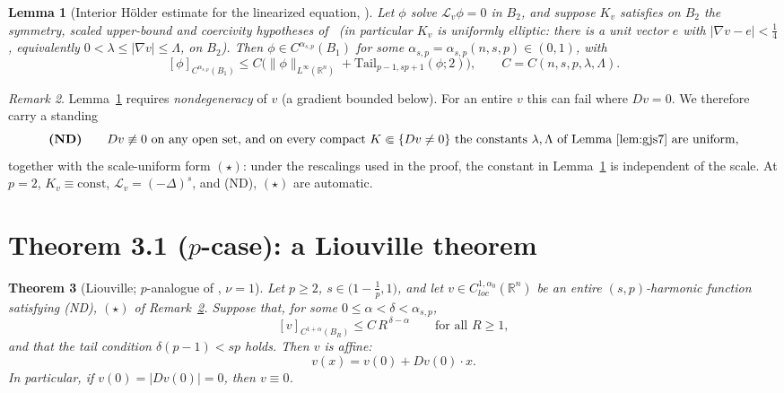 \documentclass[11pt]{amsart}
\theoremstyle{plain}
\newtheorem{theorem}{Theorem}[section]
\newtheorem{lemma}[theorem]{Lemma}
\theoremstyle{definition}
\theoremstyle{remark}
\newtheorem{remark}[theorem]{Remark}
\newcommand{\R}{\mathbb{R}}
\newcommand{\Lv}{\mathcal L_{v}}
\newcommand{\al}{\alpha}
\newcommand{\asp}{\alpha_{s,p}}
\begin{document}
\begin{lemma}[Interior H\"older estimate for the linearized equation, {\cite[\S7]{GJS}}]\label{lem:gjs7}
Let $\phi$ solve $\Lv\phi=0$ in $B_2$, and suppose $K_v$ satisfies on $B_2$ the
symmetry, scaled upper-bound and coercivity hypotheses of~\cite[Thm 7.3]{GJS}
\textnormal{(}in particular $K_v$ is \emph{uniformly elliptic}: there is a unit
vector $e$ with $|\nabla v-e|<\tfrac14$, equivalently $0<\lambda\le|\nabla v|\le
\Lambda$, on $B_2$\textnormal{)}. Then $\phi\in C^{\asp}(B_{1})$ for some
$\asp=\asp(n,s,p)\in(0,1)$, with
\[
  [\phi]_{C^{\asp}(B_{1})}\le C\big(\|\phi\|_{L^\infty(\R^n)}
   +\mathrm{Tail}_{p-1,sp+1}(\phi;2)\big),\qquad C=C(n,s,p,\lambda,\Lambda).
\]
\end{lemma}

\begin{remark}\label{rem:nondeg}
Lemma~\ref{lem:gjs7} requires \emph{nondegeneracy} of $v$ (a gradient bounded
below). For an entire $v$ this can fail where $Dv=0$. We therefore carry a
standing
\[
  \textbf{(ND)}\qquad Dv\not\equiv0\text{ on any open set, and on every compact
  }K\Subset\{Dv\ne0\}\text{ the constants }\lambda,\Lambda\text{ of
  Lemma~\ref{lem:gjs7} are uniform,}
\]
together with the scale-uniform form $(\star)$: under the rescalings used in the
proof, the constant in Lemma~\ref{lem:gjs7} is independent of the scale. At
$p=2$, $K_v\equiv\text{const}$, $\Lv=(-\Delta)^s$, and \textnormal{(ND)},
$(\star)$ are automatic.
\end{remark}

\section{Theorem 3.1 ($p$-case): a Liouville theorem}\label{sec:liouville}

\begin{theorem}[Liouville; $p$-analogue of {\cite[Thm 3.1]{PTU}}, $\nu=1$]\label{thm:liouville}
Let $p\ge2$, $s\in\big(1-\tfrac1p,1\big)$, and let $v\in C^{1,\al_0}_{loc}(\R^n)$
be an entire $(s,p)$-harmonic function satisfying \textnormal{(ND)},
$(\star)$ of Remark~\ref{rem:nondeg}. Suppose that, for some
$0\le\alpha<\delta<\asp$,
\begin{equation}\label{eq:growth}
  [v]_{C^{1+\alpha}(B_R)}\le C\,R^{\,\delta-\alpha}\qquad\text{for all }R\ge1,
\end{equation}
and that the tail condition $\delta(p-1)<sp$ holds. Then $v$ is affine:
\[
  v(x)=v(0)+Dv(0)\cdot x .
\]
In particular, if $v(0)=|Dv(0)|=0$, then $v\equiv0$.
\end{theorem}
\end{document}
